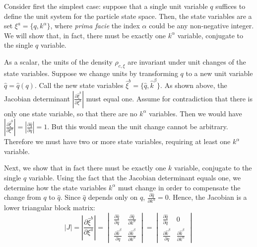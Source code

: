 \documentclass[12pt, twoside]{article}
\begin{document}
Consider first the simplest case: suppose that a single unit variable $q $ suffices to define the unit system for the particle state space. Then, the state variables are a set $\xi^a = \{ q, k^\alpha \}$, where \textit{prima facie} the index $\alpha$ could be any non-negative integer. We will show that, in fact, there must be exactly one $k^\alpha$ variable, conjugate to the single $q$ variable. 

As a scalar, the units of the density $\rho_{c, \xi}$ are invariant under unit changes of the state variables. Suppose we change units by transforming $q$ to a new unit variable $\hat{q}=\hat{q}(q)$. Call the new state variables $\hat{\xi}^b = \{ \hat{q}, \hat{k}^\beta\}$. As shown above, the Jacobian determinant $\left|\frac{\partial \hat{\xi}^b}{\partial \xi^a} \right|$ must equal one. Assume for contradiction that there is only one state variable, so that there are no $k^\alpha$ variables. Then we would have $\left|\frac{\partial \hat{\xi}^b}{\partial \xi^a} \right| = \left|\frac{\partial \hat q}{\partial q} \right| = 1$. But this would mean the unit change cannot be arbitrary. Therefore we must have two or more state variables, requiring at least one $k^\alpha$ variable. 

Next, we show that in fact there must be exactly one $k$ variable, conjugate to the single $q$ variable. Using the fact that the Jacobian determinant equals one, we determine how the state variables $k^\alpha$ must change in order to compensate the change from $q$ to $\hat q$. Since $\hat{q}$ depends only on $q$, $\frac{\partial \hat{q}}{\partial k^\alpha} = 0$. Hence, the Jacobian is a lower triangular block matrix: 
\begin{equation}
|J| = \left|\frac{\partial \hat{\xi}^b}{\partial \xi^a} \right| = \begin{vmatrix}
\frac{\partial \hat{q}}{\partial q} & \frac{\partial \hat{q}}{\partial k^\alpha} \\
\frac{\partial \hat{k}^\beta}{\partial q} & \frac{\partial \hat{k}^\beta}{\partial  k^\alpha} 
\end{vmatrix} = \begin{vmatrix}
\frac{\partial \hat{q}}{\partial q} & 0 \\
\frac{\partial \hat{k}^\beta}{\partial q} & \frac{\partial \hat{k}^\beta}{\partial  k^\alpha}
\end{vmatrix}
\end{equation}
\end{document}
